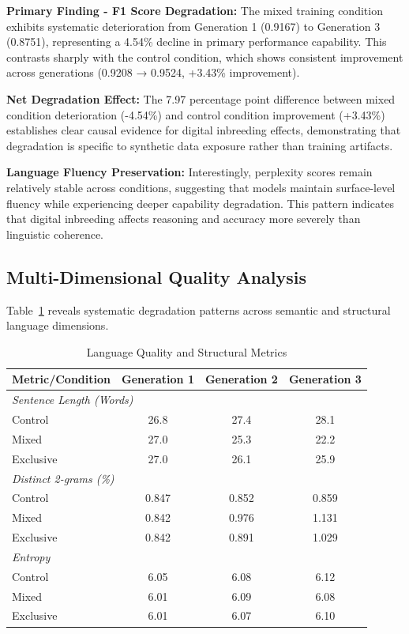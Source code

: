 \documentclass{article}
\begin{document}
\textbf{Primary Finding - F1 Score Degradation:} The mixed training condition exhibits systematic deterioration from Generation 1 (0.9167) to Generation 3 (0.8751), representing a 4.54\% decline in primary performance capability. This contrasts sharply with the control condition, which shows consistent improvement across generations (0.9208 → 0.9524, +3.43\% improvement).

\textbf{Net Degradation Effect:} The 7.97 percentage point difference between mixed condition deterioration (-4.54\%) and control condition improvement (+3.43\%) establishes clear causal evidence for digital inbreeding effects, demonstrating that degradation is specific to synthetic data exposure rather than training artifacts.

\textbf{Language Fluency Preservation:} Interestingly, perplexity scores remain relatively stable across conditions, suggesting that models maintain surface-level fluency while experiencing deeper capability degradation. This pattern indicates that digital inbreeding affects reasoning and accuracy more severely than linguistic coherence.

\subsection{Multi-Dimensional Quality Analysis}

Table~\ref{tab:quality_metrics} reveals systematic degradation patterns across semantic and structural language dimensions.

\begin{table}[h]
\caption{Language Quality and Structural Metrics}
\label{tab:quality_metrics}
\centering
\begin{tabular}{lccc}
\toprule
\textbf{Metric/Condition} & \textbf{Generation 1} & \textbf{Generation 2} & \textbf{Generation 3} \\
\midrule
\multicolumn{4}{l}{\textit{Sentence Length (Words)}} \\
Control & 26.8 & 27.4 & 28.1 \\
Mixed & 27.0 & 25.3 & 22.2 \\
Exclusive & 27.0 & 26.1 & 25.9 \\
\midrule
\multicolumn{4}{l}{\textit{Distinct 2-grams (\%)}} \\
Control & 0.847 & 0.852 & 0.859 \\
Mixed & 0.842 & 0.976 & 1.131 \\
Exclusive & 0.842 & 0.891 & 1.029 \\
\midrule
\multicolumn{4}{l}{\textit{Entropy}} \\
Control & 6.05 & 6.08 & 6.12 \\
Mixed & 6.01 & 6.09 & 6.08 \\
Exclusive & 6.01 & 6.07 & 6.10 \\
\bottomrule
\end{tabular}
\end{table}
\end{document}
